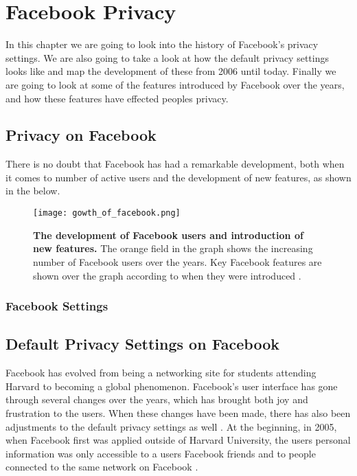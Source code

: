 \chapter{Facebook Privacy}
\label{chp:defaultprivacysettings} 


In this chapter we are going to look into the history of Facebook’s privacy settings. We are also going to take a look at how the default privacy settings looks like and map the development of these from 2006 until today. Finally we are going to look at some of the features introduced by Facebook over the years, and how these features have effected peoples privacy. 

\section{Privacy on Facebook}\label{sec:privacy_on_facebook}


There is no doubt that Facebook has had a remarkable development, both when it comes to number of active users and the development of new features, as shown in the  below. 

\begin{figure}[h!]
\centering
\texttt{[image: gowth\_of\_facebook.png]}
\caption[The development of Facebook users and introduction of new features]{\textbf{The development of Facebook users and introduction of new features.} The orange field in the graph shows the increasing number of Facebook users over the years. Key Facebook features are shown over the graph according to when they were introduced \cite{BBCFacebookGrowth}.} 
\label{fig:growth_of_facebook}
\end{figure}

\subsection{Facebook Settings}




\section{Default Privacy Settings on Facebook}\label{sec:default_privacy_settings}

Facebook has evolved from being a networking site for students attending Harvard to becoming a global phenomenon. Facebook's user interface has gone through several changes over the years, which has brought both joy and frustration to the users. When these changes have been made, there has also been adjustments to the default privacy settings as well \cite{EvoPriv2}. At the beginning, in 2005, when Facebook first was applied outside of Harvard University, the users personal information was only accessible to a users Facebook friends and to people connected to the same network on Facebook \cite{EvoPriv}. 

